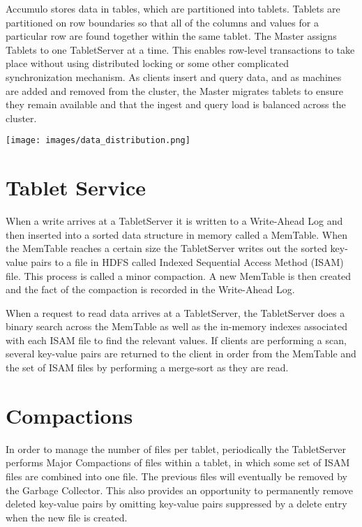 Accumulo stores data in tables, which are partitioned into tablets. Tablets are
partitioned on row boundaries so that all of the columns and values for a particular
row are found together within the same tablet. The Master assigns Tablets to one
TabletServer at a time. This enables row-level transactions to take place without
using distributed locking or some other complicated synchronization mechanism. As
clients insert and query data, and as machines are added and removed from the
cluster, the Master migrates tablets to ensure they remain available and that the
ingest and query load is balanced across the cluster.

\begin{center}
\texttt{[image: images/data\_distribution.png]}
\end{center}

\section{Tablet Service}


When a write arrives at a TabletServer it is written to a Write-Ahead Log and
then inserted into a sorted data structure in memory called a MemTable. When the
MemTable reaches a certain size the TabletServer writes out the sorted key-value
pairs to a file in HDFS called Indexed Sequential Access Method (ISAM)
file. This process is called a minor compaction. A new MemTable is then created
and the fact of the compaction is recorded in the Write-Ahead Log.

When a request to read data arrives at a TabletServer, the TabletServer does a
binary search across the MemTable as well as the in-memory indexes associated
with each ISAM file to find the relevant values. If clients are performing a
scan, several key-value pairs are returned to the client in order from the
MemTable and the set of ISAM files by performing a merge-sort as they are read.

\section{Compactions}

In order to manage the number of files per tablet, periodically the TabletServer
performs Major Compactions of files within a tablet, in which some set of ISAM
files are combined into one file. The previous files will eventually be removed
by the Garbage Collector. This also provides an opportunity to permanently
remove deleted key-value pairs by omitting key-value pairs suppressed by a
delete entry when the new file is created.

